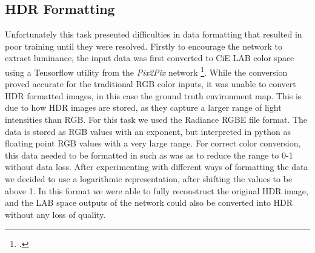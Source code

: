 \documentclass[ %
                    author={Gavin Parker},
                supervisor={Dr. Neill Campbell},
                    degree={MEng},
                     title={Deep Learning for Illumination Estimation from Stereo Images},
                  subtitle={},
                      type={Research},
                      year={2018} ]{dissertation}
\begin{document}
\subsection{HDR Formatting}
Unfortunately this task presented difficulties in data formatting that resulted in poor training until they were resolved. Firstly to encourage the network to extract luminance, the input data was first converted to CiE LAB color space using a Tensorflow utility from the \textit{Pix2Pix} network \footcite{https://github.com/affinelayer/pix2pix-tensorflow/blob/master/pix2pix.py}. While the conversion proved accurate for the traditional RGB color inputs, it was unable to convert HDR formatted images, in this case the ground truth environment map. This is due to how HDR images are stored, as they capture a larger range of light intensities than RGB. For this task we used the Radiance RGBE file format. The data is stored as RGB values with an exponent, but interpreted in python as floating point RGB values with a very large range. For correct color conversion, this data needed to be formatted in such as was as to reduce the range to 0-1 without data loss. After experimenting with different ways of formatting the data we decided to use a logarithmic representation, after shifting the values to be above 1. In this format we were able to fully reconstruct the original HDR image, and the LAB space outputs of the network could also be converted into HDR without any loss of quality.
\end{document}
